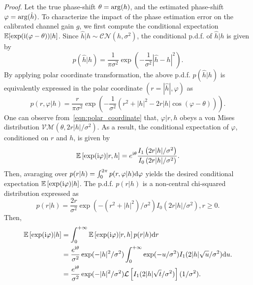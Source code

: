 \documentclass[a4paper,12pt]{article}
\def \ri {{\rm i}}
\begin{document}
{\it Proof.} Let the true phase-shift $\theta = {\rm arg}(h)$, and the estimated phase-shift $\varphi = {\rm arg}(\hat{h})$. To characterize the impact of the phase estimation error on the calibrated channel gain $g$, we first compute the conditional expectation $\mathbb{E}[\exp(\ri (\varphi-\theta)) | h]$. 
Since $\hat{h} | h \sim \mathcal{CN}(h, \sigma^2)$, the conditional p.d.f. of $\hat{h}|h$ is given by  
\begin{equation}
    p(\hat{h}|h) = \frac{1}{\pi\sigma^2}\exp\left( -\frac{1}{\sigma^2}|\hat{h}-h|^2 \right).
\end{equation}
By applying polar coordinate transformation, the above p.d.f. $p(\hat{h}|h)$ is equivalently expressed in the polar coordinate $(r=|\hat{h}|, \varphi)$ as 
\begin{equation}
    p(r, \varphi | h) = \frac{r}{\pi\sigma^2}\exp\left( -\frac{1}{\sigma^2}(r^2+|h|^2-2r|h|\cos(\varphi-\theta)) \right).
    \label{eqn:polar_coordinate}
\end{equation}
One can observe from~\eqref{eqn:polar_coordinate} that, $\varphi|r, h$ obeys a von Mises distribution $\mathcal{VM}(\theta, 2r|h|/\sigma^2)$. As a result, the conditional expectation of $\varphi$, conditioned on $r$ and $h$, is given by 
\begin{equation}
    \mathbb{E}\left[ \exp(\ri\varphi) | r, h \right] = e^{\ri\theta} \frac{I_1\left({2r|h|}/{\sigma^2}\right)}{I_0\left({2r|h|}/{\sigma^2}\right)}.
\end{equation}
Then, avaraging over $p(r|h) = \int_0^{2\pi}p(r,\varphi|h){\rm d}\varphi$ yields the desired conditional expectation $\mathbb{E}\left[ \exp(\ri\varphi)|h \right]$. The p.d.f. $p(r|h)$ is a non-central chi-squared distribution expressed as 
\begin{equation}
    p(r|h) = \frac{2r}{\sigma^2}\exp(-(r^2+|h|^2)/\sigma^2)I_0\left(2r|h|/\sigma^2\right), r\geq 0. 
\end{equation}
Then, 
\begin{equation}
    \begin{aligned}
        \mathbb{E}\left[ \exp(\ri\varphi)|h \right] &= \int_{0}^{+\infty} \mathbb{E}\left[ \exp(\ri\varphi) | r, h \right] p(r|h){\rm d}r \\
        &= \frac{e^{\ri \theta}}{\sigma^2} \exp(-|h|^2/\sigma^2) \int_{0}^{+\infty}\exp(-u/\sigma^2)I_1(2|h|\sqrt{u}/\sigma^2) {\rm d}u. \\
        &= \frac{e^{\ri \theta}}{\sigma^2} \exp(-|h|^2/\sigma^2)\mathcal{L}\left[I_1(2|h|\sqrt{t}/\sigma^2)\right](1/\sigma^2).
    \end{aligned}
\end{equation}
\end{document}
